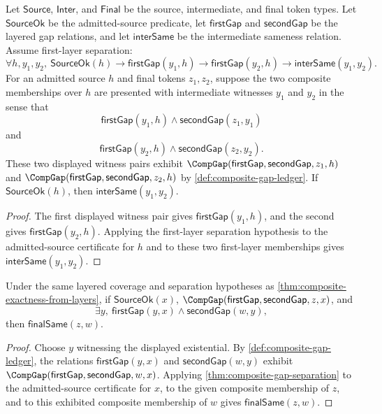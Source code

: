 \begin{theorem}
\label{thm:composite-gap-intermediate-witness-sameness}
Let $\mathsf{Source}$, $\mathsf{Inter}$, and $\mathsf{Final}$ be the source, intermediate, and final token types. Let $\mathsf{SourceOk}$ be the admitted-source predicate, let $\mathsf{firstGap}$ and $\mathsf{secondGap}$ be the layered gap relations, and let $\mathsf{interSame}$ be the intermediate sameness relation. Assume first-layer separation:
$$
\forall h,y_1,y_2,\ \mathsf{SourceOk}(h) \to
\mathsf{firstGap}(y_1,h) \to
\mathsf{firstGap}(y_2,h) \to
\mathsf{interSame}(y_1,y_2).
$$
For an admitted source $h$ and final tokens $z_1,z_2$, suppose the two composite memberships over $h$ are presented with intermediate witnesses $y_1$ and $y_2$ in the sense that
$$
\mathsf{firstGap}(y_1,h) \wedge \mathsf{secondGap}(z_1,y_1)
$$
and
$$
\mathsf{firstGap}(y_2,h) \wedge \mathsf{secondGap}(z_2,y_2).
$$
These two displayed witness pairs exhibit $\CompGap(\mathsf{firstGap},\mathsf{secondGap},z_1,h)$ and $\CompGap(\mathsf{firstGap},\mathsf{secondGap},z_2,h)$ by \autoref{def:composite-gap-ledger}. If $\mathsf{SourceOk}(h)$, then $\mathsf{interSame}(y_1,y_2)$.
\end{theorem}
\begin{proof}
The first displayed witness pair gives $\mathsf{firstGap}(y_1,h)$, and the second gives $\mathsf{firstGap}(y_2,h)$. Applying the first-layer separation hypothesis to the admitted-source certificate for $h$ and to these two first-layer memberships gives $\mathsf{interSame}(y_1,y_2)$.
\end{proof}

\begin{theorem}
\label{thm:composite-gap-witness-inversion-conservative}
Under the same layered coverage and separation hypotheses as \autoref{thm:composite-exactness-from-layers}, if $\mathsf{SourceOk}(x)$, $\CompGap(\mathsf{firstGap},\mathsf{secondGap},z,x)$, and
$$
\exists y,\ \mathsf{firstGap}(y,x) \wedge \mathsf{secondGap}(w,y),
$$
then $\mathsf{finalSame}(z,w)$.
\end{theorem}
\begin{proof}
Choose $y$ witnessing the displayed existential. By \autoref{def:composite-gap-ledger}, the relations $\mathsf{firstGap}(y,x)$ and $\mathsf{secondGap}(w,y)$ exhibit $\CompGap(\mathsf{firstGap},\mathsf{secondGap},w,x)$. Applying \autoref{thm:composite-gap-separation} to the admitted-source certificate for $x$, to the given composite membership of $z$, and to this exhibited composite membership of $w$ gives $\mathsf{finalSame}(z,w)$.
\end{proof}
